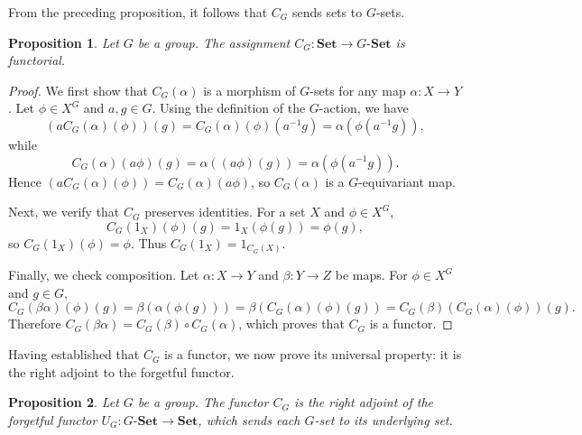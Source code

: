 \documentclass{amsart}
\newtheorem{proposition}{Proposition}
\begin{document}
From the preceding proposition, it follows that $C_G$ sends sets to $G$-sets.

\begin{proposition}\label{prop:cofree_functor}
Let $G$ be a group. The assignment $C_G \colon \mathbf{Set} \longrightarrow G\text{-}\mathbf{Set}$ is functorial.
\end{proposition}

\begin{proof}
We first show that $C_G(\alpha)$ is a morphism of $G$-sets for any map $\alpha \colon X \rightarrow Y$. Let $\phi \in X^G$ and $a, g \in G$. Using the definition of the $G$-action, we have
\[
(a C_G(\alpha)(\phi))(g) = C_G(\alpha)(\phi)(a^{-1}g) = \alpha(\phi(a^{-1}g)),
\]
while
\[
C_G(\alpha)(a \phi)(g) = \alpha((a \phi)(g)) = \alpha(\phi(a^{-1}g)).
\]
Hence $(a C_G(\alpha)(\phi)) = C_G(\alpha)(a \phi)$, so $C_G(\alpha)$ is a $G$-equivariant map.

Next, we verify that $C_G$ preserves identities. For a set $X$ and $\phi \in X^G$,
\[
C_G(1_X)(\phi)(g) = 1_X(\phi(g)) = \phi(g),
\]
so $C_G(1_X)(\phi) = \phi$. Thus $C_G(1_X) = 1_{C_G(X)}$.

Finally, we check composition. Let $\alpha \colon X \rightarrow Y$ and $\beta \colon Y \rightarrow Z$ be maps. For $\phi \in X^G$ and $g \in G$,
\[
C_G(\beta\alpha)(\phi)(g) = \beta(\alpha(\phi(g))) = \beta(C_G(\alpha)(\phi)(g)) = C_G(\beta)(C_G(\alpha)(\phi))(g).
\]
Therefore $C_G(\beta\alpha) = C_G(\beta) \circ C_G(\alpha)$, which proves that $C_G$ is a functor.
\end{proof}

Having established that $C_G$ is a functor, we now prove its universal property: it is the right adjoint to the forgetful functor.

\begin{proposition}\label{prop:cofree_adjoint}
Let $G$ be a group. The functor $C_G$ is the right adjoint of the forgetful functor 
$U_G \colon G\text{-}\mathbf{Set} \longrightarrow \mathbf{Set}$, which sends each $G$-set to its underlying set.
\end{proposition}
\end{document}
